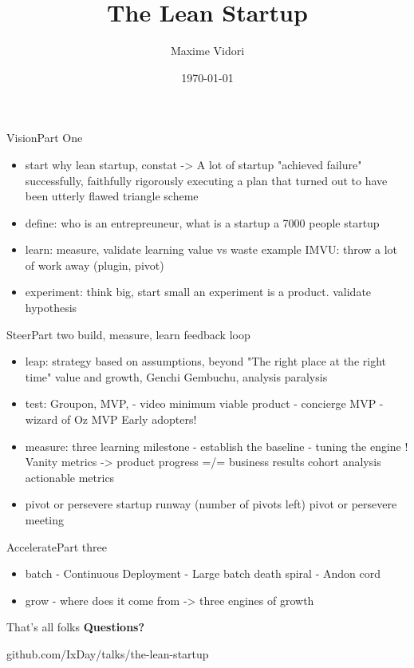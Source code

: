\documentclass[aspectratio=169]{beamer}
\title{The Lean Startup}
\date{\today}
\author{Maxime Vidori}
\begin{document}
\begin{frame}
  \titlepage
\end{frame}


\begin{frame}{Vision}{Part One}
  \begin{itemize}
    \item start
      why lean startup, constat -> A lot of startup "achieved failure"
      successfully, faithfully rigorously executing a plan that turned out to have
      been utterly flawed
        triangle scheme
      \item define: who is an entrepreuneur, what is a startup
        a 7000 people startup
      \item learn: measure, validate learning
        value vs waste
        example IMVU: throw a lot of work away (plugin, pivot)
      \item experiment: think big, start small
        an experiment is a product.
        validate hypothesis
  \end{itemize}
\end{frame}

\begin{frame}{Steer}{Part two}
build, measure, learn feedback loop
  \begin{itemize}
    \item leap: strategy based on assumptions, beyond "The right place at the right time"
      value and growth, Genchi Gembuchu, analysis paralysis
    \item test: Groupon, MVP,
      - video minimum viable product
      - concierge MVP
      - wizard of Oz MVP
      Early adopters!
    \item measure: three learning milestone
      - establish the baseline
      - tuning the engine
      ! Vanity metrics -> product progress =/= business results
        cohort analysis
        actionable metrics
    \item pivot or persevere
        startup runway (number of pivots left)
        pivot or persevere meeting
  \end{itemize}

\end{frame}

\begin{frame}{Accelerate}{Part three}

  \begin{itemize}
    \item batch
      - Continuous Deployment
      - Large batch death spiral
      - Andon cord
    \item grow
      - where does it come from -> three engines of growth


  \end{itemize}

\end{frame}

\begin{frame}{That's all folks}
  \LARGE \textbf{Questions?}

  \begin{flushright}
    \normalsize github.com/\color{Green}IxDay\color{Grey}/talks/the-lean-startup
   \end{flushright}
\end{frame}
\end{document}
